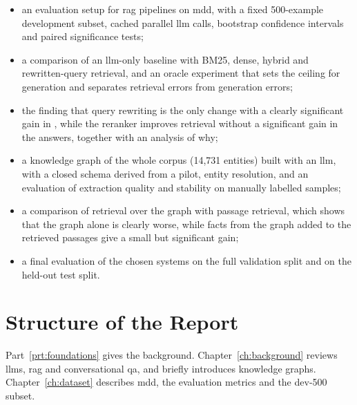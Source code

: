 \begin{itemize}
    \item an evaluation setup for \gls{rag} pipelines on \gls{mdd}, with a fixed
          500-example development subset, cached parallel \gls{llm} calls, bootstrap
          confidence intervals and paired significance tests;

    \item a comparison of an \gls{llm}-only baseline with BM25, dense, hybrid and
          rewritten-query retrieval, and an oracle experiment that sets the ceiling for
          generation and separates retrieval errors from generation errors;

    \item the finding that query rewriting is the only change with a clearly
          significant gain in \fone{}, while the reranker improves retrieval without a
          significant gain in the answers, together with an analysis of why;

    \item a knowledge graph of the whole corpus (14{,}731 entities) built with an
          \gls{llm}, with a closed schema derived from a pilot, entity resolution, and
          an evaluation of extraction quality and stability on manually labelled samples;

    \item a comparison of retrieval over the graph with passage retrieval, which shows
          that the graph alone is clearly worse, while facts from the graph added to the
          retrieved passages give a small but significant gain;

    \item a final evaluation of the chosen systems on the full validation split and on
          the held-out test split.
\end{itemize}

\section*{Structure of the Report}

Part~\ref{prt:foundations} gives the background. Chapter~\ref{ch:background} reviews
\glspl{llm}, \gls{rag} and conversational \gls{qa}, and briefly introduces knowledge
graphs. Chapter~\ref{ch:dataset} describes \gls{mdd}, the evaluation metrics and the
dev-500 subset.

